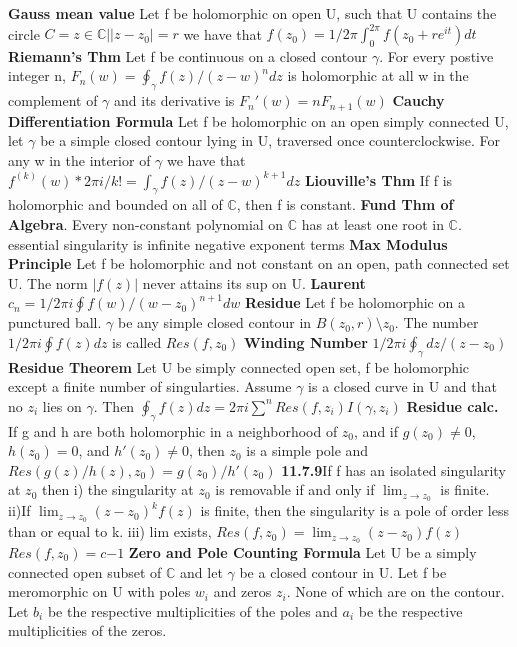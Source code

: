 \documentclass[8pt]{extarticle}
\theoremstyle{definition}
\begin{document}
\textbf{Gauss mean value} Let f be holomorphic on open U, such that U contains the circle $C = {z\in \mathbb{C}| |z-z_0| = r}$ we have that $f(z_0) = 1/2\pi \int_0^{2\pi} f(z_0 + re^{it})dt$
\textbf{Riemann's Thm} Let f be continuous on a closed contour $\gamma$. For every postive integer n, $F_n(w) = \oint_\gamma f(z)/(z-w)^ndz$ is holomorphic at all w in the complement of $\gamma$ and its derivative is $F_n'(w) = nF_{n+1}(w)$
\textbf{Cauchy Differentiation Formula} Let f be holomorphic on an open simply connected U, let $\gamma$ be a simple closed contour lying in U, traversed once counterclockwise. For any w in the interior of $\gamma$ we have that
$f^{(k)}(w) * 2\pi i /k! =  \int_\gamma f(z)/(z-w)^{k+1}dz$
\textbf{Liouville's Thm} If f is holomorphic and bounded on all of $\mathbb{C}$, then f is constant. 
\textbf{Fund Thm of Algebra}. Every non-constant polynomial on $\mathbb{C}$ has at least one root in $\mathbb{C}$. 
essential singularity is infinite negative exponent terms
\textbf{Max Modulus Principle} Let f be holomorphic and not constant on an open, path connected set U. The norm $|f(z)|$ never attains its sup on U.
\textbf{Laurent} $c_n = 1/2\pi i \oint f(w)/(w-z_0)^{n+1}dw$
\textbf{Residue} Let f be holomorphic on a punctured ball. $\gamma$ be any simple closed contour in $B(z_0,r)\setminus {z_0}$. The number $1/2\pi i \oint f(z) dz$ is called $Res(f,z_0)$
\textbf{Winding Number} $1/2\pi i \oint _\gamma dz/ (z-z_0)$
\textbf{Residue Theorem} Let U be simply connected open set, f be holomorphic except a finite number of singularties. Assume $\gamma$ is a closed curve in U and that no $z_i$ lies on $\gamma$. Then $\oint _\gamma f(z)dz = 2\pi i \sum^n Res(f,z_i)I(\gamma,z_i)$
\textbf{Residue calc.} If g and h are both holomorphic in a neighborhood of $z_0$, and if $g(z_0) \neq 0$, $h(z_0) = 0$, and $h'(z_0) \neq 0$, then $z_0$ is a simple pole and $Res(g(z)/h(z), z_0) = g(z_0)/h'(z_0)$
\textbf{11.7.9}If f has an isolated singularity at $z_0$ then i) the singularity at $z_0$ is removable if and only if $\lim_{z \to z_0}$ is finite. ii)If $\lim_{z\to z_0} (z-z_0)^k f(z)$ is finite, then the singularity is a pole of order less than or equal to k. iii) lim exists, $Res(f,z_0) = \lim_{z \to z_0} (z-z_0)f(z)$
$Res(f,z_0) = c{-1}$
\textbf{Zero and Pole Counting Formula} Let U be a simply connected open subset of $\mathbb{C}$ and let $\gamma$ be a closed contour in U. Let f be meromorphic on U with poles ${w_i}$ and zeros ${z_i}$. None of which are on the contour. Let ${b_i}$ be the respective multiplicities of the poles and ${a_i}$ be the respective multiplicities of the zeros. 
\end{document}
